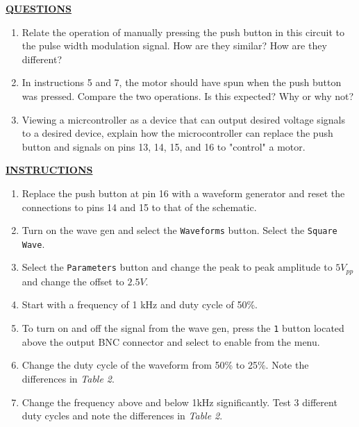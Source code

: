 \documentclass[12pt]{article}
\begin{document}
\textbf{\underline{QUESTIONS}}
\begin{enumerate}
    \item Relate the operation of manually pressing the push button in this circuit to the pulse width modulation signal. How are they similar? How are they different?
        \fillwithlines{1in}
    \item In instructions 5 and 7, the motor should have spun when the push button was pressed. Compare the two operations. Is this expected? Why or why not?
        \fillwithlines{1in}
    \item Viewing a micrcontroller as a device that can output desired voltage signals to a desired device, explain how the microcontroller can replace the push button and signals on pins 13, 14, 15, and 16 to "control" a motor.
        \fillwithlines{1in}
\end{enumerate}

\textbf{\underline{INSTRUCTIONS}}
\begin{enumerate}
    \item Replace the push button at pin 16 with a waveform generator and reset the connections to pins 14 and 15 to that of the schematic.
    \item Turn on the wave gen and select the \texttt{Waveforms} button. Select the \texttt{Square Wave}.
    \item Select the \texttt{Parameters} button and change the peak to peak amplitude to $5V_{pp}$ and change the offset to $2.5V$.
    \item Start with a frequency of 1 kHz and duty cycle of 50\%.
    \item To turn on and off the signal from the wave gen, press the \texttt{1} button located above the output BNC connector and select to enable from the menu.
    \item Change the duty cycle of the waveform from 50\% to 25\%. Note the differences in \textit{Table 2}.
    \item Change the frequency above and below 1kHz significantly. Test 3 different duty cycles and note the differences in \textit{Table 2}.
\end{enumerate}
\end{document}
